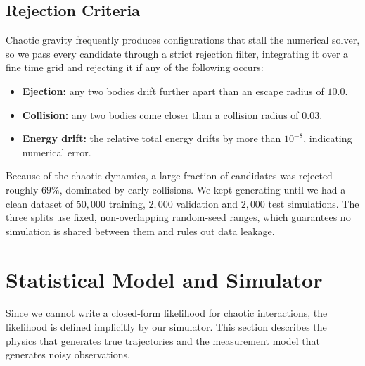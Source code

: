 \documentclass[12pt]{article}
\begin{document}
\subsection{Rejection Criteria}
Chaotic gravity frequently produces configurations that stall the numerical solver, so we
pass every candidate through a strict rejection filter, integrating it over a fine time
grid and rejecting it if any of the following occurs:
\begin{itemize}
    \item \textbf{Ejection:} any two bodies drift further apart than an escape radius of $10.0$.
    \item \textbf{Collision:} any two bodies come closer than a collision radius of $0.03$.
    \item \textbf{Energy drift:} the relative total energy drifts by more than $10^{-8}$,
    indicating numerical error.
\end{itemize}
Because of the chaotic dynamics, a large fraction of candidates was rejected---roughly
$69\%$, dominated by early collisions. We kept generating until we had a clean dataset of
$50{,}000$ training, $2{,}000$ validation and $2{,}000$ test simulations. The three splits
use fixed, non-overlapping random-seed ranges, which guarantees no simulation is shared
between them and rules out data leakage.
 
\section{Statistical Model and Simulator}
Since we cannot write a closed-form likelihood for chaotic interactions, the likelihood is
defined implicitly by our simulator. This section describes the physics that generates true
trajectories and the measurement model that generates noisy observations.
 
\end{document}

